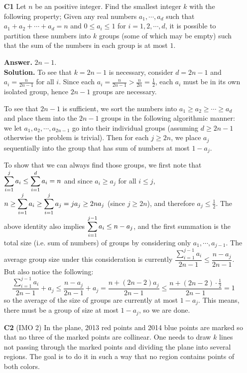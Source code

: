 \documentclass[11pt,a4paper]{article}
\begin{document}
\begin{enumerate}
	\item[\textbf{C1}] Let $n$ be an positive integer. Find the smallest integer $k$ with the following property; Given any real numbers $a_1 , \cdots , a_d $ such that $a_1 + a_2 + \cdots + a_d = n$ and $0 \le a_i \le 1$ for $i=1,2,\cdots ,d$, it is possible to partition these numbers into $k$ groups (some of which may be empty) such that the sum of the numbers in each group is at most $1$.
	
	\textbf{Answer.} $2n-1$.\\
	\textbf{Solution.} To see that $k=2n-1$ is necessary, consider $d=2n-1$ and $a_i=\frac{n}{2n-1}$ for all $i$. Since each $a_i=\frac{n}{2n-1}>\frac{n}{2n}=\frac 12$, each $a_i$ must be in its own isolated group, hence $2n-1$ groups are necessary. 
	
	To see that $2n-1$ is sufficient, we sort the numbers into $a_1\ge a_2\ge\cdots \ge a_d$ and place them into the $2n-1$ groups in the following algorithmic manner: we let $a_1, a_2, \cdots , a_{2n-1}$ go into their individual groups (assuming $d\ge 2n-1$ otherwise the problem is trivial). 
	Then for each $j\ge 2n$, we place $a_j$ sequentially into the group that has sum of numbers at most $1-a_j$. 
	
	To show that we can always find those groups, we first note that $\displaystyle\sum_{i=1}^j a_i\le \displaystyle\sum_{i=1}^d a_i=n$ and since $a_i\ge a_j$ for all $i\le j$, $n\ge \displaystyle\sum_{i=1}^j a_i\ge \displaystyle\sum_{i=1}^j a_j=ja_j\ge 2na_j$ (since $j\ge 2n$), and therefore $a_j\le \frac 12$. 
	The above identity also implies $\displaystyle\sum_{i=1}^{j-1}a_i\le n-a_j$, and the first summation is the total size (i.e. sum of numbers) of groups by considering only $a_1,\cdots , a_{j-1}$. 
	The average group size under this consideration is currently 
	$\dfrac{\sum_{i=1}^{j-1}a_i}{2n-1}\le \dfrac{n-a_j}{2n-1}$. But also notice the following: 
	\[
	\dfrac{\sum_{i=1}^{j-1}a_i}{2n-1}+a_j\le \dfrac{n-a_j}{2n-1}+a_j
	=\frac{n+(2n-2)a_j}{2n-1}
	\le\frac{n+(2n-2)\cdot\frac 12}{2n-1}
	=1
	\]
	so the average of the size of groups are currently at most $1-a_j$. This means, there must be a group of size at most $1-a_j$, so we are done. 
	
	\item [\textbf{C2}] (IMO 2) In the plane, 2013 red points and 2014 blue points are marked so that no three of the marked points are collinear. One needs to draw $k$ lines not passing through the marked points and dividing the plane into several regions. The goal is to do it in such a way that no region contains points of both colors.
	

\end{enumerate}
\end{document}
